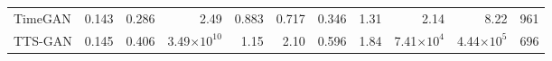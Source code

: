 \begin{tabular}{lrrrrrrrrrr}
TimeGAN & \cellcolor[HTML]{7aae7f}\textcolor[HTML]{f1f1f1}{0.143}& \cellcolor[HTML]{edd0d8}\textcolor[HTML]{000000}{0.286}& \cellcolor[HTML]{92bc96}\textcolor[HTML]{000000}{2.49}& \cellcolor[HTML]{e7aebf}\textcolor[HTML]{000000}{0.883}& \cellcolor[HTML]{e6a3b6}\textcolor[HTML]{000000}{0.717}& \cellcolor[HTML]{b6d2b8}\textcolor[HTML]{000000}{0.346}& \cellcolor[HTML]{dfeae0}\textcolor[HTML]{000000}{1.31}& \cellcolor[HTML]{95be99}\textcolor[HTML]{000000}{2.14}& \cellcolor[HTML]{77ac7c}\textcolor[HTML]{f1f1f1}{8.22}& \cellcolor[HTML]{d53d69}\textcolor[HTML]{f1f1f1}{961}\\
TTS-GAN & \cellcolor[HTML]{7caf82}\textcolor[HTML]{f1f1f1}{0.145}& \cellcolor[HTML]{de7292}\textcolor[HTML]{f1f1f1}{0.406}& \cellcolor[HTML]{d53d69}\textcolor[HTML]{f1f1f1}{3.49×$10^{10}$}& \cellcolor[HTML]{d53d69}\textcolor[HTML]{f1f1f1}{1.15}& \cellcolor[HTML]{d53d69}\textcolor[HTML]{f1f1f1}{2.10}& \cellcolor[HTML]{edcfd7}\textcolor[HTML]{000000}{0.596}& \cellcolor[HTML]{e188a2}\textcolor[HTML]{f1f1f1}{1.84}& \cellcolor[HTML]{d53d69}\textcolor[HTML]{f1f1f1}{7.41×$10^{4}$}& \cellcolor[HTML]{d53d69}\textcolor[HTML]{f1f1f1}{4.44×$10^{5}$}& \cellcolor[HTML]{e5a0b4}\textcolor[HTML]{000000}{696}\\
\end{tabular}
